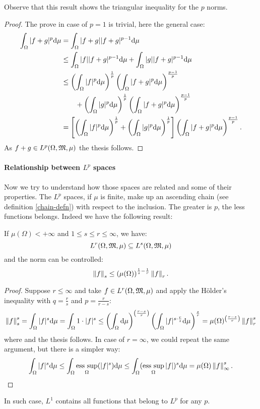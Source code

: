 Observe that this result shows the triangular inequality for the $p$ norms.

\begin{proof}
	The prove in case of $p=1$ is trivial, here the general case:
	\begin{align*}
		\int_\Omega |f+g|^p \mathrm d \mu &= \int_\Omega |f+g| |f+g|^{p-1} \mathrm d \mu \\
		&\leq \int_\Omega |f||f+g|^{p-1}\mathrm d \mu + \int_\Omega |g||f+g|^{p-1} \mathrm d \mu \\
		& \leq \left(\int_\Omega |f|^p \mathrm d \mu\right)^{\frac 1 p}
		\left(\int_\Omega|f+g|^p \mathrm d \mu\right)^{\frac{p-1}{p}} \\
		&\qquad + \left(\int_\Omega |g|^p \mathrm d \mu\right)^{\frac 1 p}\left(\int_\Omega|f+g|^p\mathrm d \mu\right)^{\frac{p-1}{p}} \\
		& = \left[\left(\int_\Omega |f|^p \mathrm d \mu\right)^{\frac 1 p}+\left(\int_\Omega |g|^p \mathrm d \mu\right)^{\frac 1 p}\right] \left( \int_\Omega |f+g| ^p \mathrm d \mu\right)^{\frac{p-1}{p}}.
	\end{align*}
	As $f+g \in L^p(\Omega, \mathfrak M, \mu)$ the thesis follows.
\end{proof}

\paragraph{Relationship between $L^p$ spaces} Now we try to understand how those spaces are related and some of their properties. The $L^p$ spaces, if $\mu$ is finite, make up an ascending chain (see definition \vref{chain-defn}) with respect to the inclusion. The greater is $p$, the less functions belongs. Indeed we have the following result:
\begin{prop}\label{prop-relations-between-Lp}
	If $\mu(\Omega) < +\infty$ and $1 \leq s \leq r \leq \infty$, we have:
	$$L^r(\Omega,\mathfrak M,\mu)\subseteq L^s(\Omega,\mathfrak M,\mu)$$
	and the norm can be controlled:
	$$\left\lVert f\right\rVert_s \leq \left(\mu(\Omega)\right)^{\frac 1 s - \frac 1 r}\left\lVert f\right\rVert_r.$$
\end{prop}
\begin{proof}
	Suppose $r\leq \infty$ and take $f\in L^r(\Omega, \mathfrak M, \mu)$ and apply the Hölder's inequality with $q = \frac r s$ and $p = \frac{r}{r-s}$:
	$$
	\left\lVert f\right\rVert_s^s
	=\int_\Omega |f|^s \mathrm d \mu 
	= \int_\Omega 1 \cdot |f|^s 
	\leq 
		\left(\int_\Omega \mathrm d \mu\right)^{\left(\frac{r-s}{r} \right)}
		\left(\int_\Omega |f|^{s \cdot \frac r s} \mathrm d \mu\right)^{\frac s r }
	= \mu(\Omega)^{\left(\frac{r-s}{r} \right)}\left\lVert f\right\rVert_r^s
	$$
	where and the thesis follows.
	In case of $r=\infty$, we could repeat the same argument, but there is a simpler way:
	$$
	\int_\Omega |f|^s \mathrm d \mu 
	\leq \int_\Omega \operatorname*{ess\ sup}_\Omega (|f|^s) \mathrm d \mu 
	\leq \int_\Omega (\operatorname*{ess\ sup}_\Omega |f|)^s \mathrm d \mu 
	= \mu(\Omega)\left\lVert f\right\rVert^s_\infty
	.
	$$
\end{proof}
In such case, $L^1$ contains all functions that belong to $L^p$ for any $p$.

